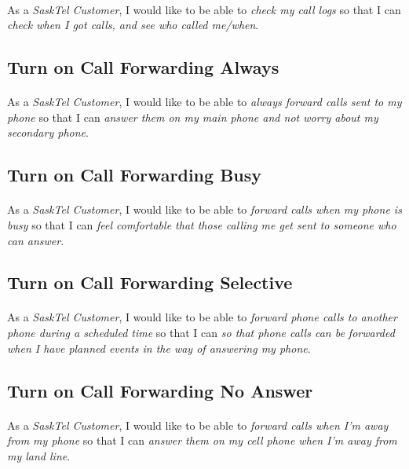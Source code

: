 \documentclass[12pt]{article}
\begin{document}
\paragraph{}	As a \textit{SaskTel Customer}, I would like to be able to \textit{check my call logs} so that I can \textit{check when I got calls, and see who called me/when}.

\subsection{Turn on Call Forwarding Always}
\paragraph{}	As a \textit{SaskTel Customer}, I would like to be able to \textit{always forward calls sent to my phone} so that I can \textit{answer them on my main phone and not worry about my secondary phone}.

\subsection{Turn on Call Forwarding Busy}
\paragraph{}	As a \textit{SaskTel Customer}, I would like to be able to \textit{forward calls when my phone is busy} so that I can \textit{feel comfortable that those calling me get sent to someone who can answer}.

\subsection{Turn on Call Forwarding Selective}
\paragraph{}	As a \textit{SaskTel Customer}, I would like to be able to \textit{forward phone calls to another phone during a scheduled time} so that I can \textit{so that phone calls can be forwarded when I have planned events in the way of answering my phone}.

\subsection{Turn on Call Forwarding No Answer}
\paragraph{}	As a \textit{SaskTel Customer}, I would like to be able to \textit{forward calls when I'm away from my phone} so that I can \textit{answer them on my cell phone when I'm away from my land line}.
\end{document}
